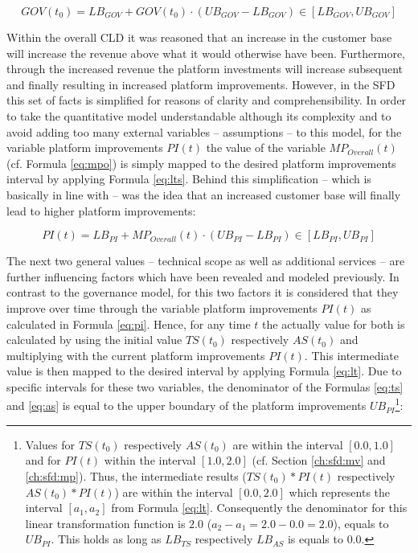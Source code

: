 \begin{equation}\label{eq:gov}
	GOV(t_0) = LB_{GOV} + GOV(t_0) \cdot (UB_{GOV} - LB_{GOV}) \in [LB_{GOV},UB_{GOV}]
\end{equation}

Within the overall \ac{CLD} it was reasoned that an increase in the customer base will increase the revenue above what it would otherwise have been. Furthermore, through the increased revenue the platform investments will increase subsequent and finally resulting in increased platform improvements. However, in the \ac{SFD} this set of facts is simplified for reasons of clarity and comprehensibility. In order to take the quantitative model understandable although its complexity and to avoid adding too many external variables -- assumptions -- to this model, for the variable  platform improvements $PI(t)$ the value of the variable $MP_{Overall}(t)$ (cf. Formula \ref{eq:mpo}) is simply mapped to the desired platform improvements interval by applying Formula \ref{eq:lts}. Behind this simplification -- which is basically in line with \citet[p. 200]{Evans2003} -- was the idea that an increased customer base will finally lead to higher platform improvements:

\begin{equation}\label{eq:pi}
	PI(t) = LB_{PI} + MP_{Overall}(t) \cdot (UB_{PI} - LB_{PI}) \in [LB_{PI},UB_{PI}]
\end{equation}

The next two general values -- technical scope as well as additional services -- are further influencing factors which have been revealed and modeled previously. In contrast to the governance model, for this two factors it is considered that they improve over time through the variable platform improvements $PI(t)$ as calculated in Formula \ref{eq:pi}. Hence, for any time $t$ the actually value for both is calculated by using the initial value $TS(t_0)$ respectively $ AS(t_0)$ and multiplying with the current platform improvements $PI(t)$. This intermediate value is then mapped to the desired interval by applying Formula \ref{eq:lt}. Due to specific intervals for these two variables, the denominator of the Formulas \ref{eq:ts} and \ref{eq:as} is equal to the upper boundary of the platform improvements $UB_{PI}$\footnote{Values for $TS(t_0)$ respectively $AS(t_0)$ are within the interval $[0.0,1.0]$ and for $PI(t)$ within the interval $[1.0,2.0]$ (cf. Section \ref{ch:sfd:mv} and \ref{ch:sfd:mp}). Thus, the intermediate results ($TS(t_0)*PI(t)$ respectively $AS(t_0) *PI(t)$) are within the interval $[0.0,2.0]$ which represents the interval $[a_1,a_2]$ from Formula \ref{eq:lt}. Consequently the denominator for this linear transformation function is $2.0$ ($a_2 - a_1 = 2.0 - 0.0 = 2.0$), equals to $UB_{PI}$. This holds as long as $LB_{TS}$ respectively $LB_{AS}$ is equals to $0.0$.}:

